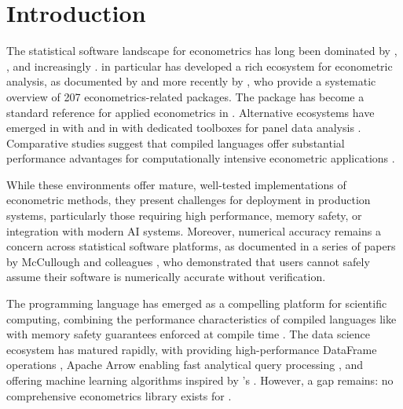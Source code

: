 
\section{Introduction} \label{sec:intro}

The statistical software landscape for econometrics has long been dominated by
 \citep{R}, , and increasingly .
 in particular has developed a rich ecosystem for econometric analysis,
as documented by \cite{Zeileis+Koenker:2008} and more recently by
\cite{Michelaki+Tsagris:2025}, who provide a systematic overview of 207
econometrics-related  packages. The  package
\citep{Kleiber+Zeileis:2008, AER} has become a standard reference for applied
econometrics in . Alternative ecosystems have emerged in
 with  \citep{Santiago-Calderon:2020}
and in  with dedicated toolboxes for panel data analysis
\citep{Alvarez+Barbero+Zofio:2017}. Comparative studies suggest that compiled
languages offer substantial performance advantages for computationally intensive
econometric applications \citep{Aruoba+Fernandez-Villaverde:2015,
Duarte+Duarte+Fonseca+Montecinos:2020}.

While these environments offer mature, well-tested implementations of econometric
methods, they present challenges for deployment in production systems, particularly
those requiring high performance, memory safety, or integration with modern AI
systems. Moreover, numerical accuracy remains a concern across statistical software
platforms, as documented in a series of papers by McCullough and colleagues
\citep{McCullough:1997, McCullough+Vinod:1999, McCullough:1999b}, who demonstrated
that users cannot safely assume their software is numerically accurate without
verification.

The  programming language has emerged as a compelling platform for
scientific computing, combining the performance characteristics of compiled
languages like  with memory safety guarantees enforced at compile
time \citep{Rust}. The  data science ecosystem has matured rapidly,
with  providing high-performance DataFrame operations \citep{polars},
Apache Arrow  enabling fast analytical query processing
\citep{Lamb+etal:2024}, and  \citep{linfa} offering machine learning
algorithms inspired by 's . However, a gap
remains: no comprehensive econometrics library exists for .

